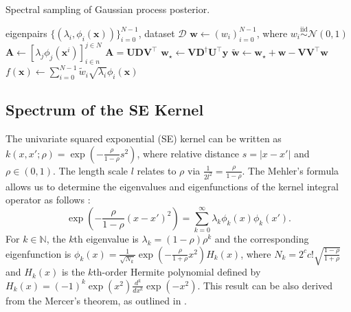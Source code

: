 \documentclass{article}
\newcommand{\edit}[1]{\textcolor{blue!80!black}{#1}} %
\begin{document}
\begin{algorithm}[h]
  \caption{Spectral sampling of Gaussian process posterior.}
  \label{alg:sam_postGP}
  \begin{algorithmic}[1] %
    \Input eigenpairs $\{(\lambda_i, \phi_i(\mathbf{x}))\}_{i=0}^{N-1}$,
  dataset $\mathcal{D}$
    \State $\mathbf{w} \gets (w_i)_{i=0}^{N-1}$, where
  $w_i \overset{\text{iid}}{\sim} \mathcal{N}(0,1)$
    \State $\mathbf{A} \gets [\lambda_j \phi_j(\mathbf{x}^i)]_{i \in n}^{j \in N}$
    \State $\mathbf{A} = \mathbf{U} \mathbf{D} \mathbf{V}^\intercal$ 
    \State $\mathbf{w}_\star \gets \mathbf{V} \mathbf{D}^\dagger \mathbf{U}^\intercal \mathbf{y}$
    \State $\widetilde{\mathbf{w}} \gets \mathbf{w}_\star + \mathbf{w} - \mathbf{V} \mathbf{V}^\intercal \mathbf{w}$
    \State \Return $f(\mathbf{x}) \gets \sum_{i=0}^{N-1} \widetilde{w}_i \sqrt{\lambda_i} \phi_i(\mathbf{x})$
  \end{algorithmic}
\end{algorithm}

\subsection{Spectrum of the SE Kernel}

\edit{
The univariate squared exponential (SE) kernel can be written as
$k(x, x'; \rho) = \exp(-\frac{\rho}{1-\rho} s^2)$, where relative distance $s = |x - x'|$ and $\rho \in (0,1)$.
The length scale $l$ relates to $\rho$ via $\frac{1}{2 l^2} = \frac{\rho}{1-\rho}$.
The Mehler's formula allows us to determine the eigenvalues and eigenfunctions of the kernel integral operator as follows \cite{Vinaroz2022}:
% 
\begin{equation}\label{}
	\exp(-\frac{\rho}{1-\rho} (x - x')^2) = \sum_{k=0}^{\infty} \lambda_k \phi_k(x) \phi_k(x').
\end{equation} 
For $k \in \mathbb{N}$, the $k$th eigenvalue is $\lambda_k = (1-\rho) \rho^k$ and the corresponding eigenfunction is
$\phi_k(x) = \frac{1}{\sqrt{N_k}} \exp\left(-\frac{\rho}{1+\rho} x^2\right) H_k(x)$, where $N_k = 2^c c! \sqrt{\frac{1-\rho}{1+\rho}}$ and $H_k(x)$ is the $k$th-order Hermite polynomial defined by
$H_k(x) = (-1)^k \exp(x^2) \frac{d^k}{dx^k} \exp(-x^2)$.
This result can be also derived from the Mercer's theorem, as outlined in \cite{ZhuHY1998}.
}
\end{document}
